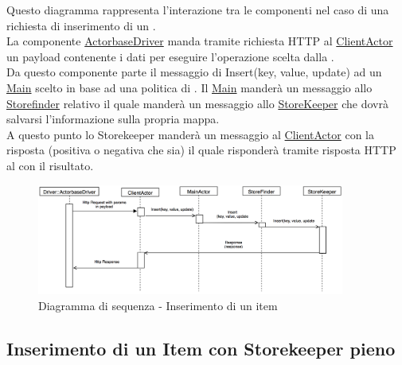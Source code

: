 \documentclass{scalatekids-article}
\begin{document}
Questo diagramma rappresenta l'interazione tra le componenti nel caso di una richiesta di inserimento di un .\\
La componente \hyperref[sec:actorbase::driver::ActorbaseDriver]{ActorbaseDriver}
manda tramite richiesta HTTP al \hyperref[sec:actorbase::actorsystem::actors::clientactor::ClientActor]{ClientActor}
un payload contenente i dati per eseguire l'operazione scelta dalla .\\
Da questo componente parte il messaggio di Insert(key, value, update) ad un \hyperref[sec:actorbase::actorsystem::actors::main::Main]{Main} scelto in base ad una
politica di . Il \hyperref[sec:actorbase::actorsystem::actors::main::Main]{Main} manderà un messaggio allo \hyperref[sec:actorbase::actorsystem::actors::storefinder::Storefinder]{Storefinder} relativo il quale manderà un messaggio allo \hyperref[sec:actorbase::actorsystem::actors::storekeeper::StoreKeeper]{StoreKeeper} che dovrà salvarsi l'informazione
sulla propria mappa.\\
A questo punto lo Storekeeper manderà un messaggio al \hyperref[sec:actorbase::actorsystem::actors::clientactor::ClientActor]{ClientActor} con la risposta
(positiva o negativa che sia) il quale risponderà tramite risposta HTTP al  con il risultato.
\begin{figure}[H]
  \begin{center}
    \includegraphics[width=0.9\textwidth, keepaspectratio]{img/diagrammiSequenza/esempioInsert.png}
    \caption{Diagramma di sequenza - Inserimento di un item}
  \end{center}
\end{figure}

\subsection{Inserimento di un Item con Storekeeper pieno}
\end{document}

